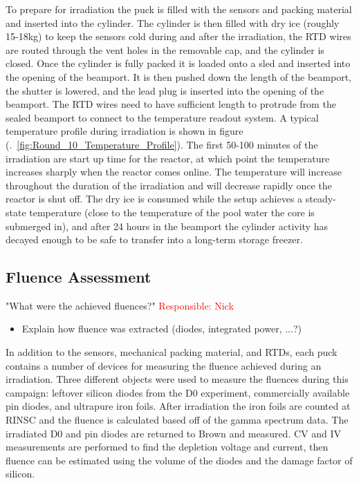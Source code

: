 To prepare for irradiation the puck is filled with the sensors and packing material and inserted into the cylinder. 
The cylinder is then filled with dry ice (roughly 15-18kg) to keep the sensors cold during and after the irradiation, the RTD wires are routed through the vent holes in the removable cap, and the cylinder is closed. 
Once the cylinder is fully packed it is loaded onto a sled and inserted into the opening of the beamport.
It is then pushed down the length of the beamport, the shutter is lowered, and the lead plug is inserted into the opening of the beamport.
The RTD wires need to have sufficient length to protrude from the sealed beamport to connect to the temperature readout system. 
A typical temperature profile during irradiation is shown in figure (.~\ref{fig:Round_10_Temperature_Profile}).
The first 50-100 minutes of the irradiation are start up time for the reactor, at which point the temperature increases sharply when the reactor comes online.
The temperature will increase throughout the duration of the irradiation and will decrease rapidly once the reactor is shut off. 
The dry ice is consumed while the setup achieves a steady-state temperature (close to the temperature of the pool water the core is submerged in), and after 24 hours in the beamport the cylinder activity has decayed enough to be safe to transfer into a long-term storage freezer.

\subsection{Fluence Assessment}
"What were the achieved fluences?" \textcolor{red}{Responsible: Nick}
\label{subsec:fluence_assessment}
\begin{itemize}
  \item Explain how fluence was extracted (diodes, integrated power, ...?)
\end{itemize}

In addition to the sensors, mechanical packing material, and RTDs, each puck contains a number of devices for measuring the fluence achieved during an irradiation. 
Three different objects were used to measure the fluences during this campaign: leftover silicon diodes from the D0 experiment, commercially available pin diodes, and ultrapure iron foils. 
After irradiation the iron foils are counted at RINSC and the fluence is calculated based off of the gamma spectrum data.
The irradiated D0 and pin diodes are returned to Brown and measured.
CV and IV measurements are performed to find the depletion voltage and current, then fluence can be estimated using the volume of the diodes and the damage factor of silicon.


